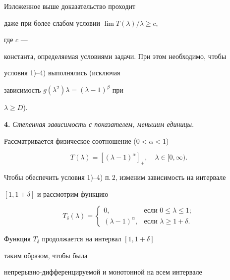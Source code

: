 


\begin{notenonum} 


Изложенное выше доказательство проходит


даже при более слабом условии $\lim T(\lambda)/\lambda\ge c$, 


где $c$ --- 


константа, определяемая условиями задачи. При этом необходимо, чтобы 


условия 1)--4) выполнялись (исключая 


зависимость $g(\lambda^2)\lambda=(\lambda-1)^\beta$ при 


$\lambda\ge D$). 


\end{notenonum} 


 


{\bf 4.} {\it Степенная зависимость с показателем, меньшим единицы.} 


Рассматривается физическое соотношение ($0<\alpha<1$) 


\begin{equation} 


T(\lambda)=[(\lambda-1)^\alpha]_+,\quad 


\lambda\in[0,\infty). 


\end{equation} 


Чтобы обеспечить условия 1)--4) п.\,2, изменим зависимость на интервале 


$[1,1+\delta]$ и рассмотрим функцию 


\begin{equation} 


T_\delta(\lambda)= 


\begin{cases} 


0,&\text{если }0\le\lambda\le 1;\\ 


(\lambda-1)^\alpha,&\text{если }\lambda\ge 1+\delta. 


\end{cases} 


\end{equation} 


Функция $T_\delta$ продолжается на интервал $[1,1+\delta]$ 


таким образом, чтобы была


непрерывно-дифференцируемой и монотонной на всем интервале 


